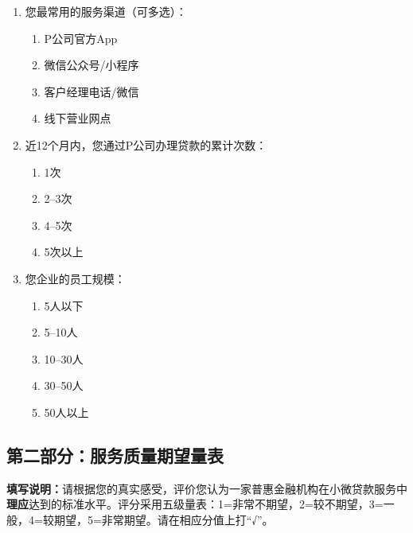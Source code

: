 \begin{enumerate}[label=\arabic*.,leftmargin=2em]
  \item 您最常用的服务渠道（可多选）：
  \begin{enumerate}[label=(\Alph*),leftmargin=2em]
    \item P公司官方App
    \item 微信公众号/小程序
    \item 客户经理电话/微信
    \item 线下营业网点
  \end{enumerate}

  \item 近12个月内，您通过P公司办理贷款的累计次数：
  \begin{enumerate}[label=(\Alph*),leftmargin=2em]
    \item 1次
    \item 2--3次
    \item 4--5次
    \item 5次以上
  \end{enumerate}

  \item 您企业的员工规模：
  \begin{enumerate}[label=(\Alph*),leftmargin=2em]
    \item 5人以下
    \item 5--10人
    \item 10--30人
    \item 30--50人
    \item 50人以上
  \end{enumerate}
\end{enumerate}

\newpage

\subsection*{第二部分：服务质量期望量表}

\textbf{填写说明：}请根据您的真实感受，评价您认为一家普惠金融机构在小微贷款服务中\textbf{理应}达到的标准水平。评分采用五级量表：1=非常不期望，2=较不期望，3=一般，4=较期望，5=非常期望。请在相应分值上打“√”。

\vspace{1em}

